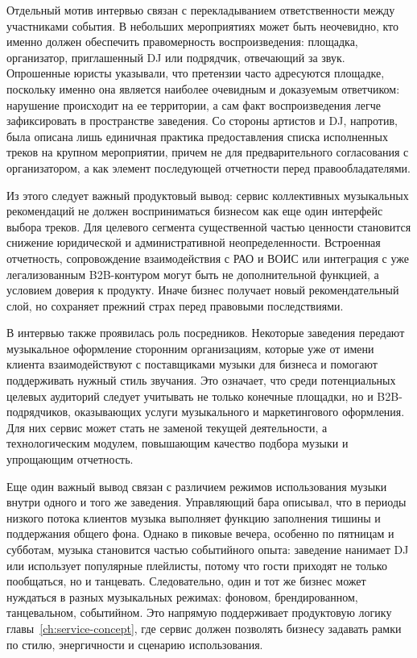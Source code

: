 Отдельный мотив интервью связан с перекладыванием ответственности между участниками события. В небольших мероприятиях может быть неочевидно, кто именно должен обеспечить правомерность воспроизведения: площадка, организатор, приглашенный DJ или подрядчик, отвечающий за звук. Опрошенные юристы указывали, что претензии часто адресуются площадке, поскольку именно она является наиболее очевидным и доказуемым ответчиком: нарушение происходит на ее территории, а сам факт воспроизведения легче зафиксировать в пространстве заведения. Со стороны артистов и DJ, напротив, была описана лишь единичная практика предоставления списка исполненных треков на крупном мероприятии, причем не для предварительного согласования с организатором, а как элемент последующей отчетности перед правообладателями.

Из этого следует важный продуктовый вывод: сервис коллективных музыкальных рекомендаций не должен восприниматься бизнесом как еще один интерфейс выбора треков. Для целевого сегмента существенной частью ценности становится снижение юридической и административной неопределенности. Встроенная отчетность, сопровождение взаимодействия с РАО и ВОИС или интеграция с уже легализованным B2B-контуром могут быть не дополнительной функцией, а условием доверия к продукту. Иначе бизнес получает новый рекомендательный слой, но сохраняет прежний страх перед правовыми последствиями.

В интервью также проявилась роль посредников. Некоторые заведения передают музыкальное оформление сторонним организациям, которые уже от имени клиента взаимодействуют с поставщиками музыки для бизнеса и помогают поддерживать нужный стиль звучания. Это означает, что среди потенциальных целевых аудиторий следует учитывать не только конечные площадки, но и B2B-подрядчиков, оказывающих услуги музыкального и маркетингового оформления. Для них сервис может стать не заменой текущей деятельности, а технологическим модулем, повышающим качество подбора музыки и упрощающим отчетность.

Еще один важный вывод связан с различием режимов использования музыки внутри одного и того же заведения. Управляющий бара описывал, что в периоды низкого потока клиентов музыка выполняет функцию заполнения тишины и поддержания общего фона. Однако в пиковые вечера, особенно по пятницам и субботам, музыка становится частью событийного опыта: заведение нанимает DJ или использует популярные плейлисты, потому что гости приходят не только пообщаться, но и танцевать. Следовательно, один и тот же бизнес может нуждаться в разных музыкальных режимах: фоновом, брендированном, танцевальном, событийном. Это напрямую поддерживает продуктовую логику главы~\ref{ch:service-concept}, где сервис должен позволять бизнесу задавать рамки по стилю, энергичности и сценарию использования.

